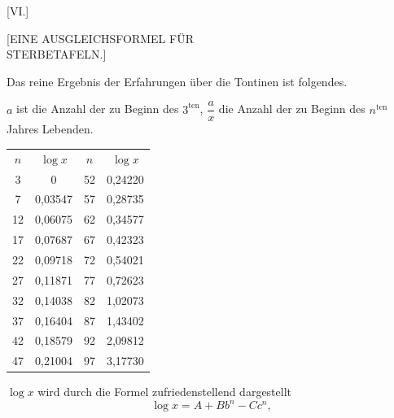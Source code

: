 \clearpage
{}
\begin{center}
[VI.]

{\large [EINE AUSGLEICHSFORMEL FÜR\\ STERBETAFELN.]}
\end{center}



Das reine Ergebnis der Erfahrungen über die Tontinen ist folgendes.

$a$ ist die Anzahl der zu Beginn des $3^{\text{ten}}$, $\dfrac{a}{x}$ die Anzahl der zu Beginn des $n^{\text{ten}}$ Jahres Lebenden.

\begin{center}
\begin{tabular}{cc|cc}
$n$ & $\log x$ & $n$ & $\log x$ \\
3 & 0 & 52 & 0,24220 \\
7 & 0,03547 & 57 & 0,28735 \\
12 & 0,06075 & 62 & 0,34577 \\
17 & 0,07687 & 67 & 0,42323 \\
22 & 0,09718 & 72 & 0,54021 \\
27 & 0,11871 & 77 & 0,72623 \\
32 & 0,14038 & 82 & 1,02073 \\
37 & 0,16404 & 87 & 1,43402 \\
42 & 0,18579 & 92 & 2,09812 \\
47 & 0,21004 & 97 & 3,17730 \\
\end{tabular}
\end{center}

$\log x$ wird durch die Formel zufriedenstellend dargestellt
\[
\log x = A+Bb^n-Cc^n,
\]
